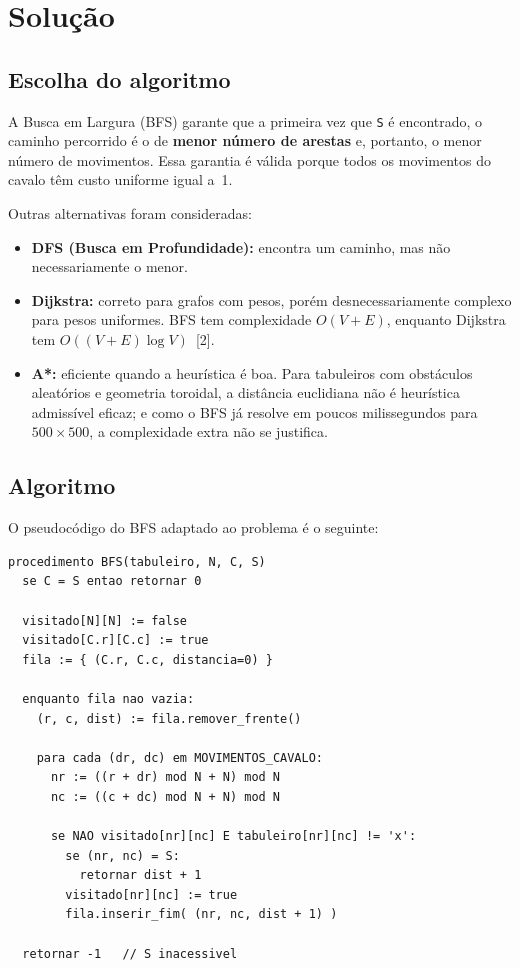 \documentclass[12pt]{article}
\begin{document}
\newpage

\section*{Solução}

\subsection*{Escolha do algoritmo}

A Busca em Largura (BFS) garante que a primeira vez que \texttt{S} é encontrado, o
caminho percorrido é o de \textbf{menor número de arestas} e, portanto, o menor número
de movimentos. Essa garantia é válida porque todos os movimentos do cavalo têm custo
uniforme igual a~1.

Outras alternativas foram consideradas:

\begin{itemize}[leftmargin=2.2em,itemsep=0.4em]
  \item \textbf{DFS (Busca em Profundidade):} encontra um caminho, mas não
        necessariamente o menor.
  \item \textbf{Dijkstra:} correto para grafos com pesos, porém desnecessariamente
        complexo para pesos uniformes. BFS tem complexidade $O(V+E)$, enquanto
        Dijkstra tem $O((V+E)\log V)$~[2].
  \item \textbf{A*:} eficiente quando a heurística é boa. Para tabuleiros com
        obstáculos aleatórios e geometria toroidal, a distância euclidiana não é
        heurística admissível eficaz; e como o BFS já resolve em poucos
        milissegundos para $500 \times 500$, a complexidade extra não se justifica.
\end{itemize}

\subsection*{Algoritmo}

O pseudocódigo do BFS adaptado ao problema é o seguinte:

\begin{lstlisting}
procedimento BFS(tabuleiro, N, C, S)
  se C = S entao retornar 0

  visitado[N][N] := false
  visitado[C.r][C.c] := true
  fila := { (C.r, C.c, distancia=0) }

  enquanto fila nao vazia:
    (r, c, dist) := fila.remover_frente()

    para cada (dr, dc) em MOVIMENTOS_CAVALO:
      nr := ((r + dr) mod N + N) mod N
      nc := ((c + dc) mod N + N) mod N

      se NAO visitado[nr][nc] E tabuleiro[nr][nc] != 'x':
        se (nr, nc) = S:
          retornar dist + 1
        visitado[nr][nc] := true
        fila.inserir_fim( (nr, nc, dist + 1) )

  retornar -1   // S inacessivel
\end{lstlisting}
\end{document}
